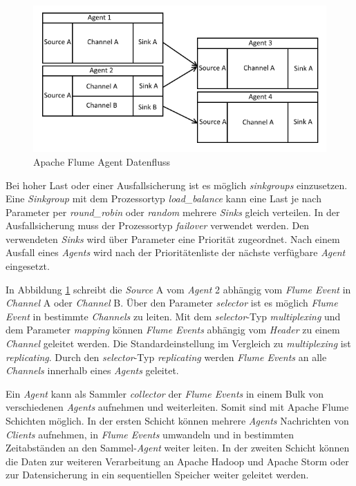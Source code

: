 \begin{figure}[htb!]
\centering
\includegraphics[width=1.0\textwidth]{bilder/flumeAgentChaining.png}
\caption{Apache Flume Agent Datenfluss
\label{fig:flumeAgentChaining}}
\end{figure}

Bei hoher Last oder einer Ausfallsicherung ist es möglich \textit{sinkgroups} einzusetzen. Eine \textit{Sinkgroup} mit dem Prozessortyp \textit{load\_balance} kann eine Last je nach Parameter per \textit{round\_robin} oder \textit{random} mehrere \textit{Sinks} gleich verteilen. In der Ausfallsicherung muss der Prozessortyp \textit{failover} verwendet werden. Den verwendeten \textit{Sinks} wird über Parameter eine Priorität zugeordnet. Nach einem Ausfall eines \textit{Agents} wird nach der Prioritätenliste der nächste verfügbare \textit{Agent} eingesetzt. 

In Abbildung \ref{fig:flumeAgentChaining} schreibt die \textit{Source} A vom \textit{Agent} 2 abhängig vom \textit{Flume Event} in \textit{Channel} A oder \textit{Channel} B. Über den Parameter \textit{selector} ist es möglich \textit{Flume Event} in bestimmte \textit{Channels} zu leiten. Mit dem \textit{selector}-Typ \textit{multiplexing} und dem Parameter \textit{mapping} können \textit{Flume Events} abhängig vom \textit{Header} zu einem \textit{Channel} geleitet werden. Die Standardeinstellung im Vergleich zu \textit{multiplexing} ist \textit{replicating}. Durch den \textit{selector}-Typ \textit{replicating} werden \textit{Flume Events} an alle \textit{Channels} innerhalb eines \textit{Agents} geleitet. 

Ein \textit{Agent} kann als Sammler \textit{collector} der \textit{Flume Events} in einem Bulk von verschiedenen \textit{Agents} aufnehmen und weiterleiten. Somit sind mit Apache Flume Schichten möglich. In der ersten Schicht können mehrere \textit{Agents} Nachrichten von \textit{Clients} aufnehmen, in \textit{Flume Events} umwandeln und in bestimmten Zeitabständen an den Sammel-\textit{Agent} weiter leiten. In der zweiten Schicht können die Daten zur weiteren Verarbeitung an Apache Hadoop und Apache Storm oder zur Datensicherung in ein sequentiellen Speicher weiter geleitet werden. 

